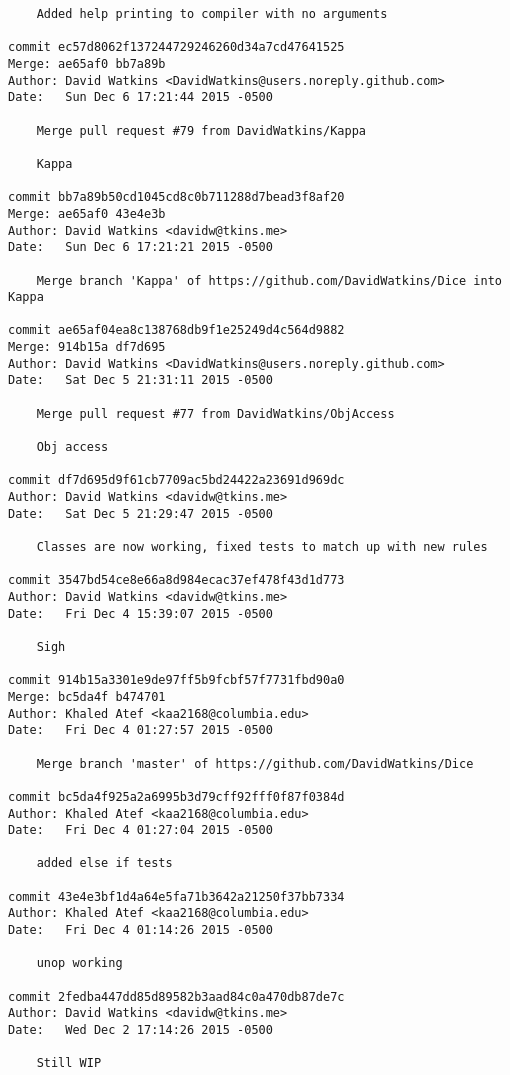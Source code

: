 \begin{verbatim}
    Added help printing to compiler with no arguments

commit ec57d8062f137244729246260d34a7cd47641525
Merge: ae65af0 bb7a89b
Author: David Watkins <DavidWatkins@users.noreply.github.com>
Date:   Sun Dec 6 17:21:44 2015 -0500

    Merge pull request #79 from DavidWatkins/Kappa
    
    Kappa

commit bb7a89b50cd1045cd8c0b711288d7bead3f8af20
Merge: ae65af0 43e4e3b
Author: David Watkins <davidw@tkins.me>
Date:   Sun Dec 6 17:21:21 2015 -0500

    Merge branch 'Kappa' of https://github.com/DavidWatkins/Dice into Kappa

commit ae65af04ea8c138768db9f1e25249d4c564d9882
Merge: 914b15a df7d695
Author: David Watkins <DavidWatkins@users.noreply.github.com>
Date:   Sat Dec 5 21:31:11 2015 -0500

    Merge pull request #77 from DavidWatkins/ObjAccess
    
    Obj access

commit df7d695d9f61cb7709ac5bd24422a23691d969dc
Author: David Watkins <davidw@tkins.me>
Date:   Sat Dec 5 21:29:47 2015 -0500

    Classes are now working, fixed tests to match up with new rules

commit 3547bd54ce8e66a8d984ecac37ef478f43d1d773
Author: David Watkins <davidw@tkins.me>
Date:   Fri Dec 4 15:39:07 2015 -0500

    Sigh

commit 914b15a3301e9de97ff5b9fcbf57f7731fbd90a0
Merge: bc5da4f b474701
Author: Khaled Atef <kaa2168@columbia.edu>
Date:   Fri Dec 4 01:27:57 2015 -0500

    Merge branch 'master' of https://github.com/DavidWatkins/Dice

commit bc5da4f925a2a6995b3d79cff92fff0f87f0384d
Author: Khaled Atef <kaa2168@columbia.edu>
Date:   Fri Dec 4 01:27:04 2015 -0500

    added else if tests

commit 43e4e3bf1d4a64e5fa71b3642a21250f37bb7334
Author: Khaled Atef <kaa2168@columbia.edu>
Date:   Fri Dec 4 01:14:26 2015 -0500

    unop working

commit 2fedba447dd85d89582b3aad84c0a470db87de7c
Author: David Watkins <davidw@tkins.me>
Date:   Wed Dec 2 17:14:26 2015 -0500

    Still WIP


\end{verbatim}
